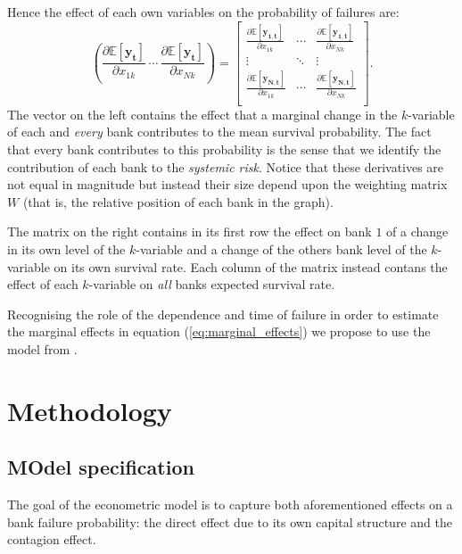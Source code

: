 \documentclass[11pt,final]{article}%
\newcommand{\vect}[1]{\bm{#1}}
\begin{document}
Hence the effect of each own variables on the probability of failures are:
\begin{equation}
\left( \frac{\partial \mathbb{E}[\vect{y_t}]  }{\partial x_{1k}} \, \cdots \, \frac{\partial \mathbb{E}[\vect{y_t}]  }{\partial x_{Nk}} \right) = 
\begin{bmatrix}
\frac{\partial \mathbb{E}[\vect{y_{1,t}}]  }{\partial x_{1k}}	&	\cdots 	&	\frac{\partial \mathbb{E}[\vect{y_{1,t}}]  }{\partial x_{Nk}}	\\
\vdots 	&	\ddots 	& \vdots  \\
\frac{\partial \mathbb{E}[\vect{y_{N,t}}]  }{\partial x_{1k}}	&	\cdots 	&	\frac{\partial \mathbb{E}[\vect{y_{N,t}}]  }{\partial x_{Nk}}	\\
\end{bmatrix}
\label{eq:marginal_effects}.
\end{equation}
The vector on the left contains the effect that a marginal change in the $k$-variable of each and \textit{every} bank contributes to the mean survival probability. The fact that every bank contributes to this probability is the sense that we identify the contribution of each bank to the \textit{systemic risk}. Notice that these derivatives are not equal in magnitude but instead their size depend upon the  weighting matrix $W$ (that is, the relative position of each bank in the graph).

The matrix on the right contains in its first row the effect on bank $1$ of a change in its own level of the $k$-variable and a change of the others bank level of the $k$-variable on its own survival rate.  Each column of the matrix instead contans the effect of each $k$-variable on \textit{all} banks expected survival rate.

Recognising the role of the dependence and time of failure in order to estimate the marginal effects in equation (\ref{eq:marginal_effects}) we propose to use the model from \cite{ElhorstHeijnenETAL2017}.

\section{Methodology}

\subsection{MOdel specification}
The goal of the econometric model is to capture both aforementioned effects on a bank failure probability: the direct effect due to its own capital structure and the contagion effect. 
\end{document}
